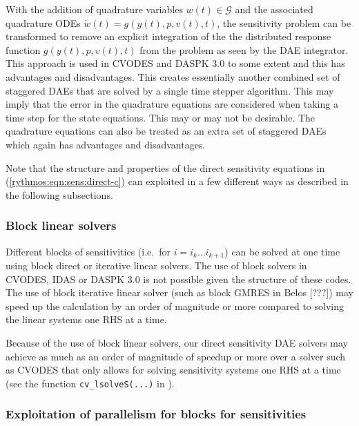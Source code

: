 \documentclass[pdf,ps2pdf,11pt]{SANDreport}
\begin{document}
With the addition of quadrature variables $w(t)\in\mathcal{G}$ and the
associated quadrature ODEs $\dot{w}(t) = g(y(t),p,v(t),t)$, the sensitivity
problem can be transformed to remove an explicit integration of the the
distributed response function $g(y(t),p,v(t),t)$ from the problem as seen by
the DAE integrator.  This approach is used in CVODES and DASPK 3.0 to some
extent and this has advantages and disadvantages.  This creates essentially
another combined set of staggered DAEs that are solved by a single time
stepper algorithm.  This may imply that the error in the quadrature equations
are considered when taking a time step for the state equations.  This may or
may not be desirable.  The quadrature equations can also be treated as an
extra set of staggered DAEs which again has advantages and disadvantages.

Note that the structure and properties of the direct sensitivity equations in
(\ref{rythmos:eqn:sens:direct-c}) can exploited in a few different ways
as described in the following subsections.

\subsubsection{Block linear solvers}

Different blocks of sensitivities (i.e.\ for $i = i_k {}\ldots i_{k+1}$) can
be solved at one time using block direct or iterative linear solvers.  The use
of block solvers in CVODES, IDAS or DASPK 3.0 is not possible given the
structure of these codes.  The use of block iterative linear solver (such as
block GMRES in Belos [???])  may speed up the calculation by an order of
magnitude or more compared to solving the linear systems one RHS at a time.

Because of the use of block linear solvers, our direct sensitivity DAE solvers
may achieve as much as an order of magnitude of speedup or more over a solver
such as CVODES that only allows for solving sensitivity systems one RHS at a
time (see the function {}\texttt{cv\_lsolveS(...)} in
{}\cite{cvodes-users-guide}).

\subsubsection{Exploitation of parallelism for blocks for sensitivities}
\end{document}
